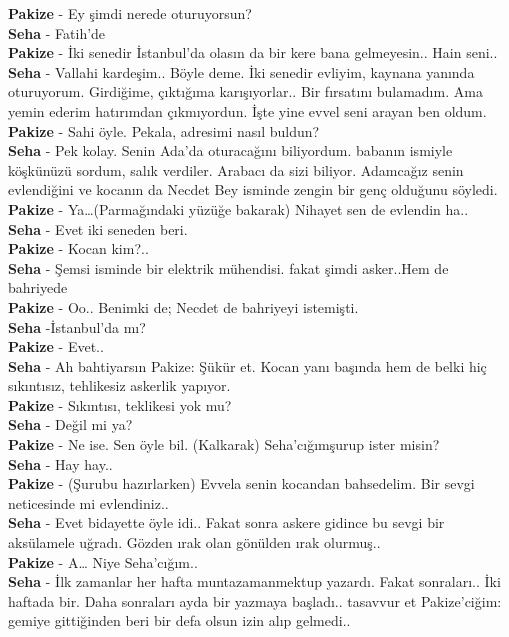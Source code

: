 \documentclass[]{book}
\begin{document}
\textbf{Pakize} - Ey şimdi nerede oturuyorsun?\\
\textbf{Seha} - Fatih'de\\
\textbf{Pakize} - İki senedir İstanbul'da olasın da bir kere bana gelmeyesin.. Hain seni..\\
\textbf{Seha} - Vallahi kardeşim.. Böyle deme. İki senedir evliyim, kaynana yanında oturuyorum. Girdiğime, çıktığıma karışıyorlar.. Bir fırsatını bulamadım. Ama yemin ederim hatırımdan çıkmıyordun. İşte yine evvel seni arayan ben oldum.\\
\textbf{Pakize} - Sahi öyle. Pekala, adresimi nasıl buldun?\\
\textbf{Seha} - Pek kolay. Senin Ada'da oturacağını biliyordum. babanın ismiyle köşkünüzü sordum, salık verdiler. Arabacı da sizi biliyor. Adamcağız senin evlendiğini ve kocanın da Necdet Bey isminde zengin bir genç olduğunu söyledi.\\
\textbf{Pakize} - Ya\ldots(Parmağındaki yüzüğe bakarak) Nihayet sen de evlendin ha..\\
\textbf{Seha} - Evet iki seneden beri.\\
\textbf{Pakize} - Kocan kim?..\\
\textbf{Seha} - Şemsi isminde bir elektrik mühendisi. fakat şimdi asker..Hem de bahriyede\\
\textbf{Pakize} - Oo.. Benimki de; Necdet de bahriyeyi istemişti.\\
\textbf{Seha} -İstanbul'da mı?\\
\textbf{Pakize} - Evet..\\
\textbf{Seha} - Ah bahtiyarsın Pakize: Şükür et. Kocan yanı başında hem de belki hiç sıkıntısız, tehlikesiz askerlik yapıyor.\\
\textbf{Pakize} - Sıkıntısı, teklikesi yok mu?\\
\textbf{Seha} - Değil mi ya?\\
\textbf{Pakize} - Ne ise. Sen öyle bil. (Kalkarak) Seha'cığımşurup ister misin?\\
\textbf{Seha} - Hay hay..\\
\textbf{Pakize} - (Şurubu hazırlarken) Evvela senin kocandan bahsedelim. Bir sevgi neticesinde mi evlendiniz..\\
\textbf{Seha} - Evet bidayette öyle idi.. Fakat sonra askere gidince bu sevgi bir aksülamele uğradı. Gözden ırak olan gönülden ırak olurmuş..\\
\textbf{Pakize} - A\ldots{} Niye Seha'cığım..\\
\textbf{Seha} - İlk zamanlar her hafta muntazamanmektup yazardı. Fakat sonraları.. İki haftada bir. Daha sonraları ayda bir yazmaya başladı.. tasavvur et Pakize'ciğim: gemiye gittiğinden beri bir defa olsun izin alıp gelmedi..\\
\end{document}
